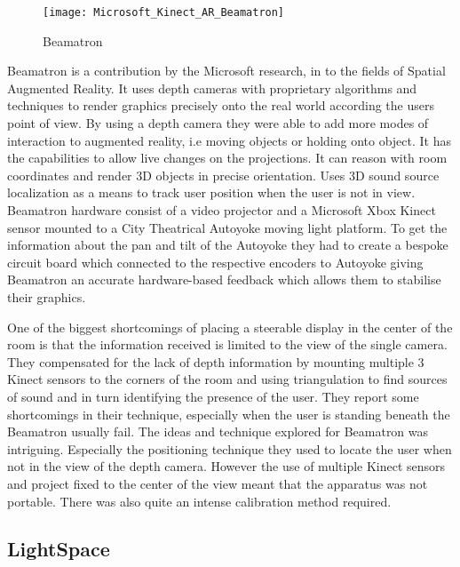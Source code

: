 \begin{figure}[h]
\texttt{[image: Microsoft\_Kinect\_AR\_Beamatron]}

\protect\caption{Beamatron}


\end{figure}


Beamatron \cite{beamatron} is a contribution by the Microsoft research,
in to the fields of Spatial Augmented Reality. It uses depth cameras
with proprietary algorithms and techniques to render graphics precisely
onto the real world according the users point of view. By using a
depth camera they were able to add more modes of interaction to augmented
reality, i.e moving objects or holding onto object. It has the capabilities
to allow live changes on the projections. It can reason with room
coordinates and render 3D objects in precise orientation. Uses 3D
sound source localization as a means to track user position when the
user is not in view. 
Beamatron hardware consist of a video projector and a Microsoft Xbox
Kinect sensor mounted to a City Theatrical Autoyoke\cite{autoyoke}
moving light platform. To get the information about the pan and tilt
of the Autoyoke they had to create a bespoke circuit board which connected
to the respective encoders to Autoyoke giving Beamatron an accurate
hardware-based feedback which allows them to stabilise their graphics. 

One of the biggest shortcomings of placing a steerable display in
the center of the room is that the information received is limited
to the view of the single camera. They compensated for the lack of
depth information by mounting multiple 3 Kinect sensors to the corners
of the room and using triangulation to find sources of sound and in
turn identifying the presence of the user. They report some shortcomings
in their technique, especially when the user is standing beneath the
Beamatron usually fail.
The ideas and technique explored for Beamatron was intriguing. Especially
the positioning technique they used to locate the user when not in
the view of the depth camera. However the use of multiple Kinect sensors
and project fixed to the center of the view meant that the apparatus
was not portable. There was also quite an intense calibration method
required.


\subsection{LightSpace}

